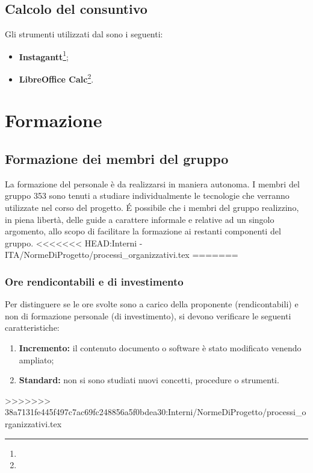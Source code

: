 \documentclass[NormeDiProgetto.tex]{subfiles}
\begin{document}
	\subsection{Calcolo del consuntivo}
	Gli strumenti utilizzati dal \respdiprog{} sono i seguenti:
	\begin{itemize}
		\item \textbf{Instagantt}\footnote{};
		\item \textbf{LibreOffice Calc}\footnote{}.
	\end{itemize}
	
	\section{Formazione}
	\subsection{Formazione dei membri del gruppo}
		La formazione del personale è da realizzarsi in maniera autonoma. I membri del gruppo 353 sono tenuti a studiare individualmente le tecnologie che verranno utilizzate nel corso del progetto. \'{E} possibile che i membri del gruppo realizzino, in piena libertà, delle guide a carattere informale e relative ad un singolo argomento, allo scopo di facilitare la formazione ai restanti componenti del gruppo.
<<<<<<< HEAD:Interni - ITA/NormeDiProgetto/processi_organizzativi.tex
=======
		
	\subsubsection{Ore rendicontabili e di investimento}
	Per distinguere se le ore svolte sono a carico della proponente (rendicontabili) e non di formazione personale (di investimento), si devono verificare le seguenti caratteristiche:
	\begin{enumerate}
		\item \textbf{Incremento:} il contenuto documento o software è stato modificato venendo ampliato;
		\item \textbf{Standard:} non si sono studiati nuovi concetti, procedure o strumenti.
	\end{enumerate}
>>>>>>> 38a7131fe445f497c7ac69fc248856a5f0bdea30:Interni/NormeDiProgetto/processi_organizzativi.tex
\end{document}
